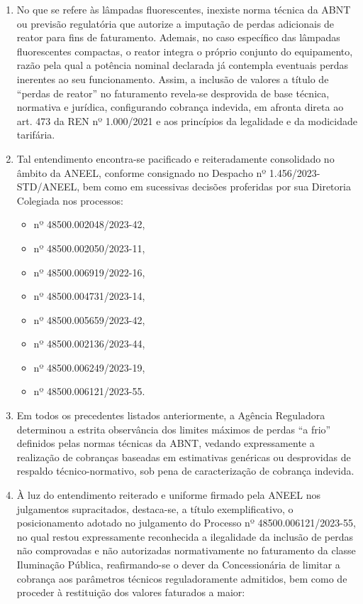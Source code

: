 \begin{enumerate}[resume]
\ifperdaFluorescente
\item %
No que se refere às lâmpadas fluorescentes, inexiste norma técnica da ABNT ou previsão regulatória que autorize a imputação de perdas adicionais de reator para fins de faturamento. Ademais, no caso específico das lâmpadas fluorescentes compactas, o reator integra o próprio conjunto do equipamento, razão pela qual a potência nominal declarada já contempla eventuais perdas inerentes ao seu funcionamento. Assim, a inclusão de valores a título de “perdas de reator” no faturamento revela-se desprovida de base técnica, normativa e jurídica, configurando cobrança indevida, em afronta direta ao art. 473 da REN nº 1.000/2021 e aos princípios da legalidade e da modicidade tarifária. 
\fi

\item 
Tal entendimento encontra-se pacificado e reiteradamente consolidado no âmbito da ANEEL, conforme consignado no Despacho nº 1.456/2023-STD/ANEEL, bem como em sucessivas decisões proferidas por sua Diretoria Colegiada nos processos:
\begin{itemize}
\item nº 48500.002048/2023-42, 
\item nº 48500.002050/2023-11, 
\item nº 48500.006919/2022-16, 
\item nº 48500.004731/2023-14, 
\item nº 48500.005659/2023-42, 
\item nº 48500.002136/2023-44,
\item nº 48500.006249/2023-19,
\item nº 48500.006121/2023-55.
\end{itemize}

\item 
Em todos os precedentes listados anteriormente, a Agência Reguladora determinou a estrita observância dos limites máximos de perdas “a frio” definidos pelas normas técnicas da ABNT, vedando expressamente a realização de cobranças baseadas em estimativas genéricas ou desprovidas de respaldo técnico-normativo, sob pena de caracterização de cobrança indevida.

\item
À luz do entendimento reiterado e uniforme firmado pela ANEEL nos julgamentos supracitados, destaca-se, a título exemplificativo, o posicionamento adotado no julgamento do Processo nº 48500.006121/2023-55, no qual restou expressamente reconhecida a ilegalidade da inclusão de perdas não comprovadas e não autorizadas normativamente no faturamento da classe Iluminação Pública, reafirmando-se o dever da Concessionária de limitar a cobrança aos parâmetros técnicos reguladoramente admitidos, bem como de proceder à restituição dos valores faturados a maior:


\end{enumerate}
